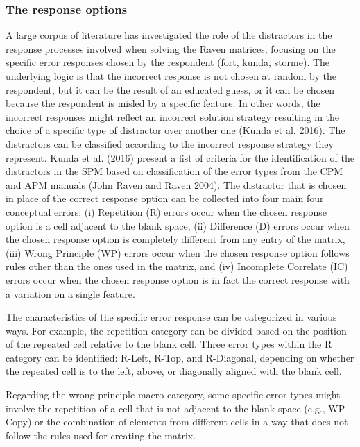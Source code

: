 \documentclass[
]{article}
\begin{document}
\subsubsection{The response options}\label{the-response-options}

A large corpus of literature has investigated the role of the
distractors in the response processes involved when solving the Raven
matrices, focusing on the specific error responses chosen by the
respondent (fort, kunda, storme). The underlying logic is that the
incorrect response is not chosen at random by the respondent, but it can
be the result of an educated guess, or it can be chosen because the
respondent is misled by a specific feature. In other words, the
incorrect responses might reflect an incorrect solution strategy
resulting in the choice of a specific type of distractor over another
one (Kunda et al. 2016). The distractors can be classified according to
the incorrect response strategy they represent. Kunda et al. (2016)
present a list of criteria for the identification of the distractors in
the SPM based on classification of the error types from the CPM and APM
manuals (John Raven and Raven 2004). The distractor that is chosen in
place of the correct response option can be collected into four main
four conceptual errors: (i) Repetition (R) errors occur when the chosen
response option is a cell adjacent to the blank space, (ii) Difference
(D) errors occur when the chosen response option is completely different
from any entry of the matrix, (iii) Wrong Principle (WP) errors occur
when the chosen response option follows rules other than the ones used
in the matrix, and (iv) Incomplete Correlate (IC) errors occur when the
chosen response option is in fact the correct response with a variation
on a single feature.

The characteristics of the specific error response can be categorized in
various ways. For example, the repetition category can be divided based
on the position of the repeated cell relative to the blank cell. Three
error types within the R category can be identified: R-Left, R-Top, and
R-Diagonal, depending on whether the repeated cell is to the left,
above, or diagonally aligned with the blank cell.

Regarding the wrong principle macro category, some specific error types
might involve the repetition of a cell that is not adjacent to the blank
space (e.g., WP-Copy) or the combination of elements from different
cells in a way that does not follow the rules used for creating the
matrix.
\end{document}
